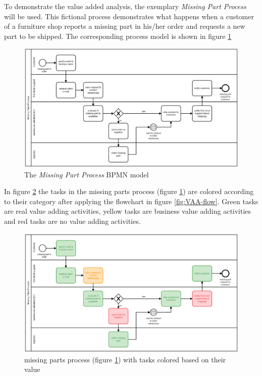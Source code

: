 To demonstrate the value added analysis, the exemplary \textit{Missing Part Process} will be used. This fictional process demonstrates what happens when a customer of a furniture shop reports a missing part in his/her order and requests a new part to be shipped. The corresponding process model is shown in figure \ref{fig:missing-part-process}

\begin{figure}[H]
	\centering
	\includegraphics[width=1\columnwidth]{processes/missing-parts-process/missing-parts-process}
	\caption{The \textit{Missing Part Process} BPMN model} 
	\label{fig:missing-part-process} 
\end{figure}

In figure \ref{fig:VAA-missing-parts} the tasks in the missing parts process (figure \ref{fig:missing-part-process}) are colored according to their category after applying the flowchart in figure \ref{fig:VAA-flow}. Green tasks are real value adding activities, yellow tasks are business value adding activities and red tasks are no value adding activities. 

\begin{figure}[H]
	\centering
	\includegraphics[width=1\columnwidth]{graphics/missing-parts-process-vaa}
	\caption{missing parts process (figure \ref{fig:missing-part-process}) with tasks colored based on their value} 
	\label{fig:VAA-missing-parts} 
\end{figure}

